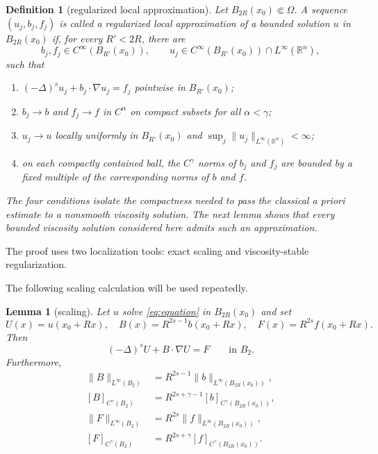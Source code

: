 \documentclass[10pt,a4paper]{amsart}
\numberwithin{equation}{section}
\newtheorem{lemma}[theorem]{Lemma}
\newtheorem{definition}[theorem]{Definition}
\newcommand{\R}{\mathbb R}
\newcommand{\rev}[1]{#1}
\begin{document}
\begin{definition}[regularized local approximation]
\label{def:approximable-viscosity}
Let $B_{2R}(x_0)\Subset\Omega$.  A sequence $(u_j,b_j,f_j)$ is called a
\emph{regularized local approximation} of a bounded solution $u$ in
$B_{2R}(x_0)$ if,
for every $R'<2R$, there are
\[
 b_j,f_j\in C^\infty(B_{R'}(x_0)),\qquad
 u_j\in C^\infty(B_{R'}(x_0))\cap L^\infty(\R^n),
\]
such that
\begin{enumerate}
\item $(-\Delta)^su_j+b_j\cdot\nabla u_j=f_j$ pointwise in
$B_{R'}(x_0)$;
\item $b_j\to b$ and $f_j\to f$ in $C^\alpha$ on compact subsets for
all $\alpha<\gamma$;
\item $u_j\to u$ locally uniformly in $B_{R'}(x_0)$ and
$\sup_j\|u_j\|_{L^\infty(\R^n)}<\infty$;
\item on each compactly contained ball, the $C^\gamma$ norms of $b_j$ and
$f_j$ are bounded by a fixed multiple of the corresponding norms of $b$
and $f$.
\end{enumerate}
The four conditions isolate the compactness needed to pass the classical
a priori estimate to a nonsmooth viscosity solution.  The next lemma shows
that every bounded viscosity solution considered here admits such an
approximation.
\end{definition}

\rev{The proof uses two localization tools: exact scaling and
viscosity-stable regularization.}

The following scaling calculation will be used repeatedly.

\begin{lemma}[scaling]\label{lem:scaling}
Let $u$ solve \eqref{eq:equation} in $B_{2R}(x_0)$ and set
\begin{equation}\label{eq:rescaling}
 U(x)=u(x_0+Rx),\quad
 B(x)=R^{2s-1}b(x_0+Rx),\quad
 F(x)=R^{2s}f(x_0+Rx).
\end{equation}
Then
\[
 (-\Delta)^sU+B\cdot\nabla U=F\qquad\text{in }B_2.
\]
Furthermore,
\begin{align*}
 \|B\|_{L^\infty(B_2)}
 &=R^{2s-1}\|b\|_{L^\infty(B_{2R}(x_0))},\\
 [B]_{C^\gamma(B_2)}
 &=R^{2s+\gamma-1}[b]_{C^\gamma(B_{2R}(x_0))},\\
 \|F\|_{L^\infty(B_2)}
 &=R^{2s}\|f\|_{L^\infty(B_{2R}(x_0))},\\
 [F]_{C^\gamma(B_2)}
 &=R^{2s+\gamma}[f]_{C^\gamma(B_{2R}(x_0))}.
\end{align*}
\end{lemma}
\end{document}
